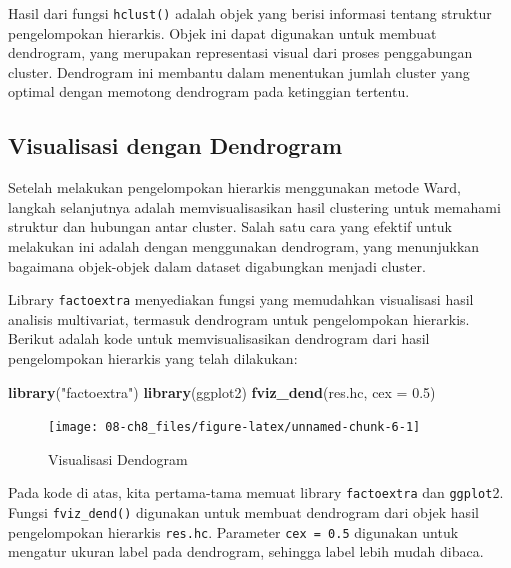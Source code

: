 \documentclass[
  oneside]{book}
\newenvironment{Shaded}{\begin{snugshade}}{\end{snugshade}}
\newcommand{\AttributeTok}[1]{\textcolor[rgb]{0.13,0.29,0.53}{#1}}
\newcommand{\FloatTok}[1]{\textcolor[rgb]{0.00,0.00,0.81}{#1}}
\newcommand{\FunctionTok}[1]{\textcolor[rgb]{0.13,0.29,0.53}{\textbf{#1}}}
\newcommand{\NormalTok}[1]{#1}
\newcommand{\StringTok}[1]{\textcolor[rgb]{0.31,0.60,0.02}{#1}}
\begin{document}
Hasil dari fungsi \texttt{hclust()} adalah objek yang berisi informasi tentang struktur pengelompokan hierarkis. Objek ini dapat digunakan untuk membuat dendrogram, yang merupakan representasi visual dari proses penggabungan cluster. Dendrogram ini membantu dalam menentukan jumlah cluster yang optimal dengan memotong dendrogram pada ketinggian tertentu.

\subsection*{Visualisasi dengan Dendrogram}\label{visualisasi-dengan-dendrogram}

Setelah melakukan pengelompokan hierarkis menggunakan metode Ward, langkah selanjutnya adalah memvisualisasikan hasil clustering untuk memahami struktur dan hubungan antar cluster. Salah satu cara yang efektif untuk melakukan ini adalah dengan menggunakan dendrogram, yang menunjukkan bagaimana objek-objek dalam dataset digabungkan menjadi cluster.

Library \texttt{factoextra} menyediakan fungsi yang memudahkan visualisasi hasil analisis multivariat, termasuk dendrogram untuk pengelompokan hierarkis. Berikut adalah kode untuk memvisualisasikan dendrogram dari hasil pengelompokan hierarkis yang telah dilakukan:

\begin{Shaded}
\begin{Highlighting}[]
\FunctionTok{library}\NormalTok{(}\StringTok{"factoextra"}\NormalTok{)}
\FunctionTok{library}\NormalTok{(ggplot2)}
\FunctionTok{fviz\_dend}\NormalTok{(res.hc, }\AttributeTok{cex =} \FloatTok{0.5}\NormalTok{)}
\end{Highlighting}
\end{Shaded}

\begin{figure}[h]

{\centering \texttt{[image: 08-ch8\_files/figure-latex/unnamed-chunk-6-1]} 

}

\caption{Visualisasi Dendogram}\label{fig:unnamed-chunk-6}
\end{figure}

Pada kode di atas, kita pertama-tama memuat library \texttt{factoextra} dan \texttt{ggplot}2. Fungsi \texttt{fviz\_dend()} digunakan untuk membuat dendrogram dari objek hasil pengelompokan hierarkis \texttt{res.hc}. Parameter \texttt{cex\ =\ 0.5} digunakan untuk mengatur ukuran label pada dendrogram, sehingga label lebih mudah dibaca.
\end{document}
